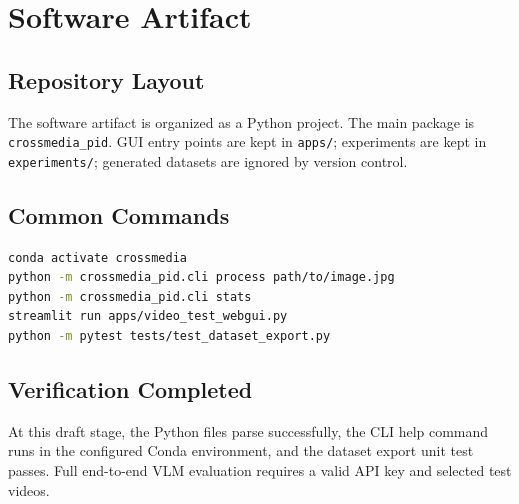 \chapter{Software Artifact}
\label{app:software}

\section{Repository Layout}

The software artifact is organized as a Python project. The main package is \texttt{crossmedia\_pid}. GUI entry points are kept in \texttt{apps/}; experiments are kept in \texttt{experiments/}; generated datasets are ignored by version control.

\section{Common Commands}

\begin{lstlisting}[language=bash]
conda activate crossmedia
python -m crossmedia_pid.cli process path/to/image.jpg
python -m crossmedia_pid.cli stats
streamlit run apps/video_test_webgui.py
python -m pytest tests/test_dataset_export.py
\end{lstlisting}

\section{Verification Completed}

At this draft stage, the Python files parse successfully, the CLI help command runs in the configured Conda environment, and the dataset export unit test passes. Full end-to-end VLM evaluation requires a valid API key and selected test videos.
